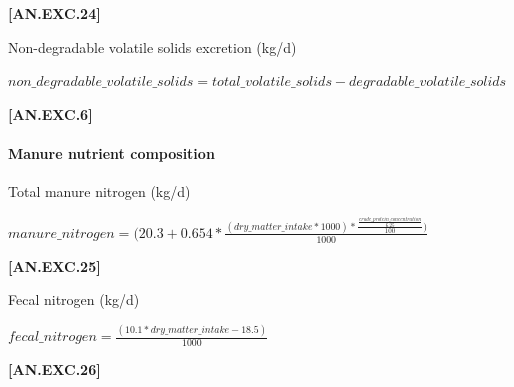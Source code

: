 \begin{refsection}
\begin{itemize}
\begin{center}
    \end{center}
        \vspace{0.5cm} 
    
            {\raggedleft \textbf{[AN.EXC.24]}\par}
            \vspace{0.5cm}
            
Non-degradable volatile solids excretion (kg/d)
        \vspace{0.5cm}
    
    \begin{center}
        \(non\_degradable\_volatile\_solids = total\_volatile\_solids - degradable\_volatile\_solids\)
    \end{center}
        \vspace{0.5cm} 
    
            {\raggedleft \textbf{[AN.EXC.6]}\par}
            \vspace{0.5cm}

\paragraph{Manure nutrient composition}
\vspace{-0.25cm}

Total manure nitrogen (kg/d)
        \vspace{0.5cm}
    
    \begin{center}
        \(manure\_nitrogen =(20.3
+0.654 * \frac{(dry\_matter\_intake * 1000)* \frac{\frac{crude\_protein\_concentration}{6.25}}{100})}{1000}
\)
    \end{center}
        \vspace{0.5cm} 
    
            {\raggedleft \textbf{[AN.EXC.25]}\par}
            \vspace{0.5cm}

Fecal nitrogen (kg/d) 
        \vspace{0.5cm}
    
    \begin{center}
        \(fecal\_nitrogen=\frac{(10.1 * dry\_matter\_intake - 18.5)}{1000} \)
    \end{center}
        \vspace{0.5cm} 
    
            {\raggedleft \textbf{[AN.EXC.26]}\par}
            \vspace{0.5cm}


\end{itemize}
\end{refsection}
